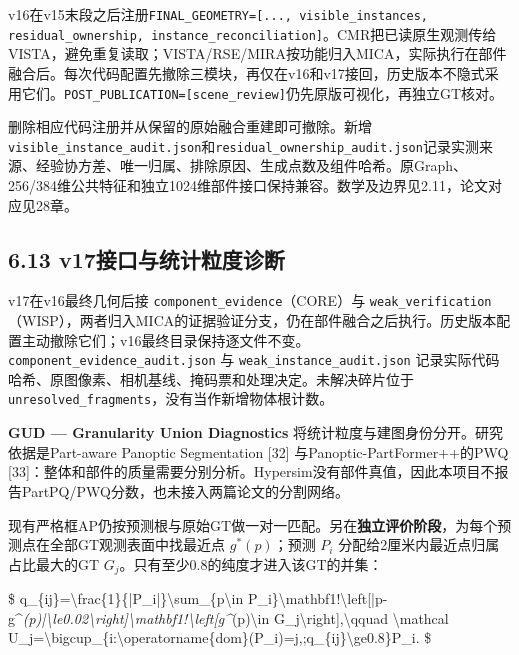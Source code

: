 \documentclass[UTF8,fontset=fandol]{ctexart}
\begin{document}
v16在v15末段之后注册\texttt{FINAL\_\allowbreak{}GEOMETRY=[.\allowbreak{}.\allowbreak{}.\allowbreak{}, visible\_\allowbreak{}instances, residual\_\allowbreak{}ownership, instance\_\allowbreak{}reconciliation]}。CMR把已读原生观测传给VISTA，避免重复读取；VISTA/RSE/MIRA按功能归入MICA，实际执行在部件融合后。每次代码配置先撤除三模块，再仅在v16和v17接回，历史版本不隐式采用它们。\texttt{POST\_\allowbreak{}PUBLICATION=[scene\_\allowbreak{}review]}仍先原版可视化，再独立GT核对。



删除相应代码注册并从保留的原始融合重建即可撤除。新增\texttt{visible\_\allowbreak{}instance\_\allowbreak{}audit.\allowbreak{}json}和\texttt{residual\_\allowbreak{}ownership\_\allowbreak{}audit.\allowbreak{}json}记录实测来源、经验协方差、唯一归属、排除原因、生成点数及组件哈希。原Graph、256/384维公共特征和独立1024维部件接口保持兼容。数学及边界见2.11，论文对应见28章。



\subsection*{6.13 v17接口与统计粒度诊断}

v17在v16最终几何后接 \texttt{component\_\allowbreak{}evidence}（CORE）与 \texttt{weak\_\allowbreak{}verification}（WISP），两者归入MICA的证据验证分支，仍在部件融合之后执行。历史版本配置主动撤除它们；v16最终目录保持逐文件不变。\texttt{component\_\allowbreak{}evidence\_\allowbreak{}audit.\allowbreak{}json} 与 \texttt{weak\_\allowbreak{}instance\_\allowbreak{}audit.\allowbreak{}json} 记录实际代码哈希、原图像素、相机基线、掩码票和处理决定。未解决碎片位于 \texttt{unresolved\_\allowbreak{}fragments}，没有当作新增物体根计数。



\textbf{GUD — Granularity Union Diagnostics} 将统计粒度与建图身份分开。研究依据是Part-aware Panoptic Segmentation [32] 与Panoptic-PartFormer++的PWQ [33]：整体和部件的质量需要分别分析。Hypersim没有部件真值，因此本项目不报告PartPQ/PWQ分数，也未接入两篇论文的分割网络。



现有严格框AP仍按预测根与原始GT做一对一匹配。另在\textbf{独立评价阶段}，为每个预测点在全部GT观测表面中找最近点 $g^*(p)$；预测 $P_i$ 分配给2厘米内最近点归属占比最大的GT $G_j$。只有至少0.8的纯度才进入该GT的并集：



\$
q\_\{ij\}=\textbackslash{}frac\{1\}\{|P\_i|\}\textbackslash{}sum\_\{p\textbackslash{}in P\_i\}\textbackslash{}mathbf1!\textbackslash{}left[|p-g\textasciicircum{}\emph{(p)|\textbackslash{}le0.02\textbackslash{}right]\textbackslash{}mathbf1!\textbackslash{}left[g\textasciicircum{}}(p)\textbackslash{}in G\_j\textbackslash{}right],\textbackslash{}qquad
\textbackslash{}mathcal U\_j=\textbackslash{}bigcup\_\{i:\textbackslash{}operatorname\{dom\}(P\_i)=j,;q\_\{ij\}\textbackslash{}ge0.8\}P\_i.
\$
\end{document}
